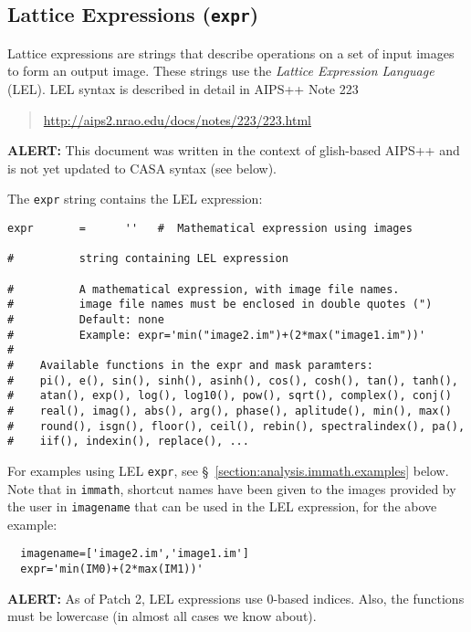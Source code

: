 \subsection{Lattice Expressions ({\tt expr})}
\label{section:analysis.pars.lattice}

Lattice expressions are strings that describe operations on a
set of input images to form an output image.  These strings
use the {\em Lattice Expression Language} (LEL).  LEL syntax
is described in detail in AIPS++ Note 223 
\begin{quote}
   \url{http://aips2.nrao.edu/docs/notes/223/223.html}
\end{quote}
{\bf ALERT:} This document was written in the context of
glish-based AIPS++ and is not yet updated to CASA syntax 
(see below).

The {\tt expr} string contains the LEL expression:
\small
\begin{verbatim}
expr       =      ''   #  Mathematical expression using images

#          string containing LEL expression

#          A mathematical expression, with image file names.
#          image file names must be enclosed in double quotes (")
#          Default: none 
#          Example: expr='min("image2.im")+(2*max("image1.im"))'
#
#    Available functions in the expr and mask paramters:
#    pi(), e(), sin(), sinh(), asinh(), cos(), cosh(), tan(), tanh(),
#    atan(), exp(), log(), log10(), pow(), sqrt(), complex(), conj()
#    real(), imag(), abs(), arg(), phase(), aplitude(), min(), max()
#    round(), isgn(), floor(), ceil(), rebin(), spectralindex(), pa(), 
#    iif(), indexin(), replace(), ...
\end{verbatim}
\normalsize

For examples using LEL {\tt expr}, see 
\S~\ref{section:analysis.immath.examples} below.  Note that in
{\tt immath}, shortcut names have been given to the images provided
by the user in {\tt imagename} that can be used in the LEL expression,
for the above example:
\small
\begin{verbatim}
  imagename=['image2.im','image1.im']
  expr='min(IM0)+(2*max(IM1))'
\end{verbatim}
\normalsize

{\bf ALERT:} As of Patch 2, LEL expressions use 0-based indices.
Also, the functions must be lowercase (in almost all cases we know
about).
    
